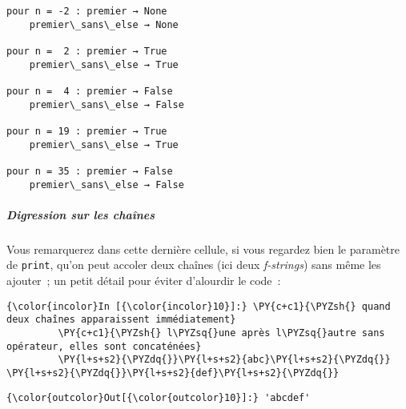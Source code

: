     \begin{Verbatim}[commandchars=\\\{\},frame=single,framerule=0.3mm,rulecolor=\color{cellframecolor}]
pour n = -2 : premier → None
    premier\_sans\_else → None

pour n =  2 : premier → True
    premier\_sans\_else → True

pour n =  4 : premier → False
    premier\_sans\_else → False

pour n = 19 : premier → True
    premier\_sans\_else → True

pour n = 35 : premier → False
    premier\_sans\_else → False
\end{Verbatim}

    \hypertarget{digression-sur-les-chauxeenes}{%
\subparagraph{Digression sur les
chaînes}\label{digression-sur-les-chauxeenes}}

    Vous remarquerez dans cette dernière cellule, si vous regardez bien le
paramètre de \texttt{print}, qu'on peut accoler deux chaînes (ici deux
\emph{f-strings}) sans même les ajouter~; un petit détail pour éviter
d'alourdir le code~:

    \begin{Verbatim}[commandchars=\\\{\},frame=single,framerule=0.3mm,rulecolor=\color{cellframecolor}]
{\color{incolor}In [{\color{incolor}10}]:} \PY{c+c1}{\PYZsh{} quand deux chaînes apparaissent immédiatement}
         \PY{c+c1}{\PYZsh{} l\PYZsq{}une après l\PYZsq{}autre sans opérateur, elles sont concaténées}
         \PY{l+s+s2}{\PYZdq{}}\PY{l+s+s2}{abc}\PY{l+s+s2}{\PYZdq{}} \PY{l+s+s2}{\PYZdq{}}\PY{l+s+s2}{def}\PY{l+s+s2}{\PYZdq{}}
\end{Verbatim}


\begin{Verbatim}[commandchars=\\\{\},frame=single,framerule=0.3mm,rulecolor=\color{cellframecolor}]
{\color{outcolor}Out[{\color{outcolor}10}]:} 'abcdef'
\end{Verbatim}
            

    
    
    
